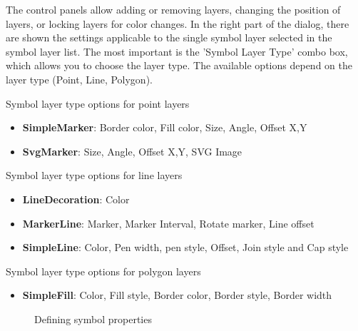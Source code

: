 The control panels allow adding or removing layers, changing the position of layers,
or locking layers for color changes. In the right part of the dialog, there are
shown the settings applicable to the single symbol layer selected in the symbol
layer list. The most important is the 'Symbol Layer Type' combo box, which allows
you to choose the layer type. The available options depend on the layer type
(Point, Line, Polygon).

\begin{description}
\item Symbol layer type options for point layers
\begin{itemize}[label=--]
\item \textbf{SimpleMarker}: Border color, Fill color, Size, Angle, Offset X,Y
\item \textbf{SvgMarker}: Size, Angle, Offset X,Y, SVG Image
\end{itemize}
\item Symbol layer type options for line layers
\begin{itemize}[label=--]
\item \textbf{LineDecoration}: Color
\item \textbf{MarkerLine}: Marker, Marker Interval, Rotate marker, Line offset
\item \textbf{SimpleLine}: Color, Pen width, pen style, Offset, Join style and Cap style
\end{itemize}
\item Symbol layer type options for polygon layers
\begin{itemize}[label=--]
\item \textbf{SimpleFill}: Color, Fill style, Border color, Border style, Border width
\end{itemize}
\end{description}


\begin{figure}[ht]
\centering
   \hspace{1cm}
   \hspace{1cm}
\caption{Defining symbol properties \nixcaption}
\end{figure}

